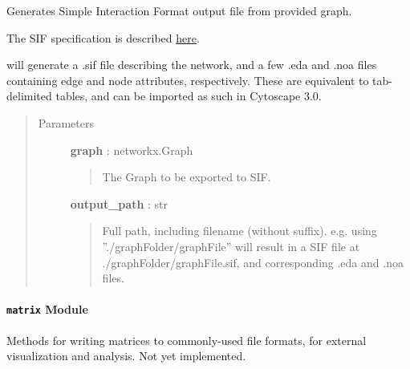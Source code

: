 \documentclass[letterpaper,10pt,english]{sphinxmanual}
\begin{document}
\begin{fulllineitems}
\label{tethne.writers:tethne.writers.graph.to_sif}
Generates Simple Interaction Format output file from provided graph.

The SIF specification is described 
\href{http://wiki.cytoscape.org/Cytoscape\_User\_Manual/Network\_Formats}{here}.

{\hyperref[tethne.writers:tethne.writers.graph.to_sif]{}} will generate a .sif file describing the network, and a few
.eda and .noa files containing edge and node attributes, respectively. These
are equivalent to tab-delimited tables, and can be imported as such in
Cytoscape 3.0.
\begin{quote}\begin{description}
\item[{Parameters }] \leavevmode
\textbf{graph} : networkx.Graph
\begin{quote}

The Graph to be exported to SIF.
\end{quote}

\textbf{output\_path} : str
\begin{quote}

Full path, including filename (without suffix).
e.g. using ''./graphFolder/graphFile'' will result in a SIF file at
./graphFolder/graphFile.sif, and corresponding .eda and .noa files.
\end{quote}

\end{description}\end{quote}

\end{fulllineitems}


\begin{fulllineitems}
\label{tethne.writers:tethne.writers.graph.to_table}
\end{fulllineitems}



\paragraph{\texttt{matrix} Module}
\label{tethne.writers:matrix-module}\label{tethne.writers:module-tethne.writers.matrix}
Methods for writing matrices to commonly-used file formats, for external
visualization and analysis. Not yet implemented.
\end{document}
